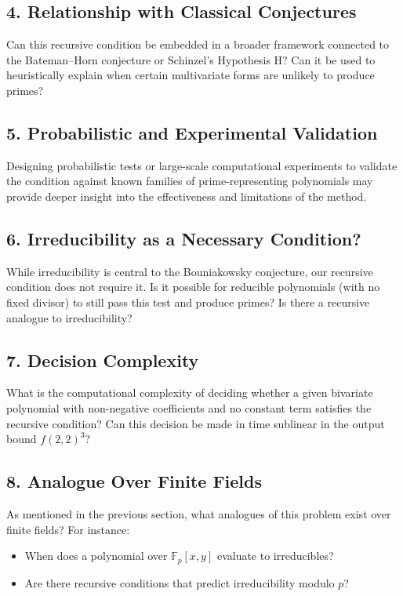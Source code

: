 \documentclass[a4paper,11pt]{article}
\begin{document}
\subsection*{4. Relationship with Classical Conjectures}

Can this recursive condition be embedded in a broader framework connected to the Bateman–Horn conjecture or Schinzel's Hypothesis H? Can it be used to heuristically explain when certain multivariate forms are unlikely to produce primes?

\subsection*{5. Probabilistic and Experimental Validation}

Designing probabilistic tests or large-scale computational experiments to validate the condition against known families of prime-representing polynomials may provide deeper insight into the effectiveness and limitations of the method.

\subsection*{6. Irreducibility as a Necessary Condition?}

While irreducibility is central to the Bouniakowsky conjecture, our recursive condition does not require it. Is it possible for reducible polynomials (with no fixed divisor) to still pass this test and produce primes? Is there a recursive analogue to irreducibility?

\subsection*{7. Decision Complexity}

What is the computational complexity of deciding whether a given bivariate polynomial with non-negative coefficients and no constant term satisfies the recursive condition? Can this decision be made in time sublinear in the output bound $f(2,2)^3$?

\subsection*{8. Analogue Over Finite Fields}

As mentioned in the previous section, what analogues of this problem exist over finite fields? For instance:
\begin{itemize}
\item When does a polynomial over $\mathbb{F}_p[x, y]$ evaluate to irreducibles?
\item Are there recursive conditions that predict irreducibility modulo $p$?
\end{itemize}
\end{document}
